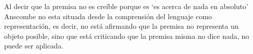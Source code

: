 Al decir que la premisa no es creíble porque es \enquote*{es acerca de nada en absoluto} Anscombe no esta situada desde la comprensión del lenguaje como representación, es decir, no está afirmando que la premisa no representa un objeto posible, sino que está criticando que la premisa misma no dice nada, no puede ser aplicada.

